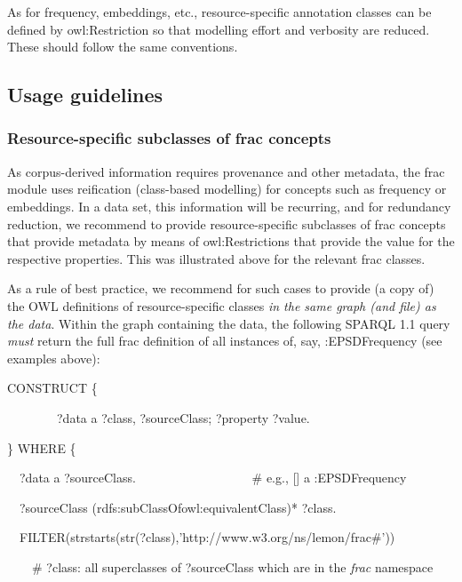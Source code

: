 \documentclass[a4paper]{article}
\newcommand\textstyleEmphasis[1]{\textit{#1}}
\newcommand\textstyleSourceText[1]{\textrm{#1}}
\newcommand\textstyleTeletype[1]{\textrm{#1}}
\begin{document}
As for frequency, embeddings, etc., resource-specific annotation classes can be defined by \textstyleTeletype{owl:Restriction} so that modelling effort and verbosity are reduced. These should follow the same conventions.

\subsection{Usage guidelines}
\subsubsection{Resource-specific subclasses of frac concepts}
As corpus-derived information requires provenance and other metadata, the frac module uses reification (class-based modelling) for concepts such as frequency or embeddings. In a data set, this information will be recurring, and for redundancy reduction, we recommend to provide resource-specific subclasses of frac concepts that provide metadata by means of \textstyleTeletype{owl:Restriction}s that provide the value for the respective properties. This was illustrated above for the relevant frac classes.

As a rule of best practice, we recommend for such cases to provide (a copy of) the OWL definitions of resource-specific classes \textstyleEmphasis{in the same graph (and file) as the data}. Within the graph containing the data, the following SPARQL 1.1 query \textstyleEmphasis{must} return the full frac definition of all instances of, say, \textstyleTeletype{:EPSDFrequency} (see examples above): 


\bigskip

\textstyleSourceText{CONSTRUCT \{}

\textstyleSourceText{\ \ \ \ \ \ \ \ ?data a ?class, ?sourceClass; ?property ?value.}

\textstyleSourceText{\} WHERE \{}

\textstyleSourceText{\ \ ?data a ?sourceClass. \ \ \ \ \ \ \ \ \ \ \ \ \ \ \ \ \ \ \# e.g., [] a :EPSDFrequency}

\textstyleSourceText{\ \ ?sourceClass (rdfs:subClassOf{\textbar}owl:equivalentClass)* ?class.}

\textstyleSourceText{\ \ FILTER(strstarts(str(?class),'http://www.w3.org/ns/lemon/frac\#'))}

\textstyleSourceText{\ \ \ \ \# ?class: all superclasses of ?sourceClass which are in the }\textstyleEmphasis{frac}\textstyleSourceText{ namespace}
\end{document}
